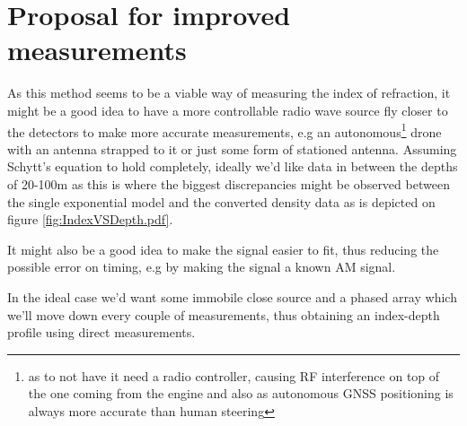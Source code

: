 \chapter*{Proposal for improved measurements}
As this method seems to be a viable way of measuring the index of refraction,
it might be a good idea to have a more controllable radio wave source fly
closer to the detectors to make more accurate measurements, e.g an
autonomous\footnote{as to not have it need a radio controller, causing RF
interference on top of the one coming from the engine and also as autonomous
GNSS positioning is always more accurate than human steering} drone with an
antenna strapped to it or just some form of stationed antenna.  Assuming
Schytt's equation to hold completely, ideally we'd like data in between the
depths of 20-100m as this is where the biggest discrepancies might be observed
between the single exponential model and the converted density data as is
depicted on figure \ref{fig:IndexVSDepth.pdf}. 

It might also be a good idea to make the signal easier to fit, thus reducing the possible 
error on timing, e.g by making the signal a known AM signal.

In the ideal case we'd want some immobile close source and a phased array which we'll
move down every couple of measurements, thus obtaining an index-depth profile
using direct measurements.

